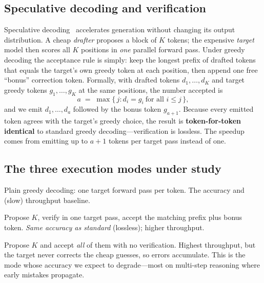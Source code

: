 \documentclass[11pt]{article}
\begin{document}
\subsection{Speculative decoding and verification}
Speculative decoding~\cite{leviathan2023,chen2023} accelerates generation
without changing its output distribution. A cheap \emph{drafter} proposes a
block of $K$ tokens; the expensive \emph{target} model then scores all $K$
positions in \emph{one} parallel forward pass. Under greedy decoding the
acceptance rule is simply: keep the longest prefix of drafted tokens that equals
the target's own greedy token at each position, then append one free
``bonus'' correction token. Formally, with drafted tokens $d_1,\dots,d_K$ and
target greedy tokens $g_1,\dots,g_K$ at the same positions, the number accepted
is
\begin{equation}
a \;=\; \max\Big\{\, j : d_i = g_i \ \text{for all } i \le j \,\Big\},
\end{equation}
and we emit $d_1,\dots,d_a$ followed by the bonus token $g_{a+1}$. Because every
emitted token agrees with the target's greedy choice, the result is
\textbf{token-for-token identical} to standard greedy decoding---verification is
lossless. The speedup comes from emitting up to $a{+}1$ tokens per target pass
instead of one.

\subsection{The three execution modes under study}
\label{sec:modes}
\begin{description}[style=nextline,leftmargin=1.5em]
  \item[Standard.] Plain greedy decoding: one target forward pass per token.
        The accuracy and (slow) throughput baseline.
  \item[Verified speculative.] Propose $K$, verify in one target pass, accept
        the matching prefix plus bonus token. \emph{Same accuracy as standard}
        (lossless); higher throughput.
  \item[Non-verification parallel.] Propose $K$ and accept \emph{all} of them
        with no verification. Highest throughput, but the target never corrects
        the cheap guesses, so errors accumulate. This is the mode whose accuracy
        we expect to degrade---most on multi-step reasoning where early mistakes
        propagate.
\end{description}

\end{document}
